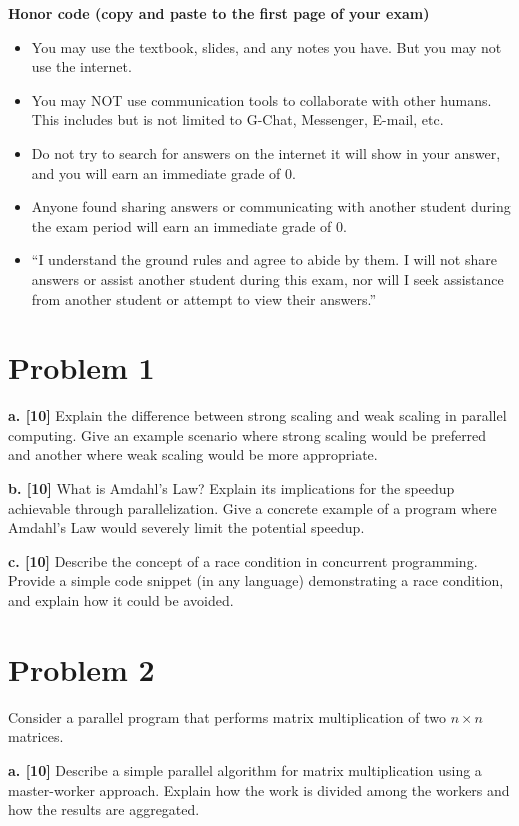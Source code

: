 \documentclass{article}
\begin{document}
\textbf{Honor code (copy and paste to the first page of your exam)}
\begin{itemize}
    \item You may use the textbook, slides, and any notes you have. But you may not use the internet.
    \item You may NOT use communication tools to collaborate with other humans. This includes but is not limited to G-Chat, Messenger, E-mail, etc.
    \item Do not try to search for answers on the internet it will show in your answer, and you will earn an immediate grade of 0.
    \item Anyone found sharing answers or communicating with another student during the exam period will earn an immediate grade of 0.
    \item “I understand the ground rules and agree to abide by them. I will not share answers or assist another student during this exam, nor will I seek assistance from another student or attempt to view their answers.”
\end{itemize}


\section*{Problem 1}
\textbf{a. [10]}  Explain the difference between strong scaling and weak scaling in parallel computing.  Give an example scenario where strong scaling would be preferred and another where weak scaling would be more appropriate.

\textbf{b. [10]} What is Amdahl's Law? Explain its implications for the speedup achievable through parallelization.  Give a concrete example of a program where Amdahl's Law would severely limit the potential speedup.

\textbf{c. [10]} Describe the concept of a race condition in concurrent programming. Provide a simple code snippet (in any language) demonstrating a race condition, and explain how it could be avoided.



\section*{Problem 2}
Consider a parallel program that performs matrix multiplication of two $n \times n$ matrices.

\textbf{a. [10]} Describe a simple parallel algorithm for matrix multiplication using a master-worker approach.  Explain how the work is divided among the workers and how the results are aggregated.
\end{document}
